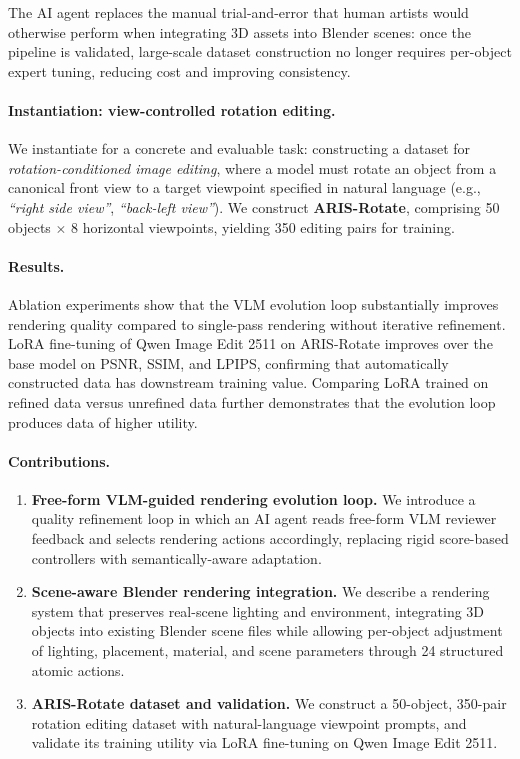 The AI agent replaces the manual trial-and-error that human artists would otherwise perform
when integrating 3D assets into Blender scenes:
once the pipeline is validated, large-scale dataset construction no longer requires
per-object expert tuning, reducing cost and improving consistency.

\paragraph{Instantiation: view-controlled rotation editing.}
We instantiate \aris{} for a concrete and evaluable task:
constructing a dataset for \emph{rotation-conditioned image editing},
where a model must rotate an object from a canonical front view to a target viewpoint
specified in natural language (e.g., \textit{``right side view''}, \textit{``back-left view''}).
We construct \textbf{ARIS-Rotate}, comprising 50 objects $\times$ 8 horizontal viewpoints,
yielding 350 editing pairs for training.

\paragraph{Results.}
Ablation experiments show that the VLM evolution loop substantially
improves rendering quality compared to single-pass rendering without iterative refinement.
LoRA fine-tuning of Qwen Image Edit 2511 on ARIS-Rotate improves over the base model
on PSNR, SSIM, and LPIPS, confirming that automatically constructed data
has downstream training value.
Comparing LoRA trained on refined data versus unrefined data further demonstrates
that the evolution loop produces data of higher utility.

\paragraph{Contributions.}
\begin{enumerate}
  \item \textbf{Free-form VLM-guided rendering evolution loop.}
    We introduce a quality refinement loop in which an AI agent reads
    free-form VLM reviewer feedback and selects rendering actions accordingly,
    replacing rigid score-based controllers with semantically-aware adaptation.

  \item \textbf{Scene-aware Blender rendering integration.}
    We describe a rendering system that preserves real-scene lighting and environment,
    integrating 3D objects into existing Blender scene files while allowing
    per-object adjustment of lighting, placement, material, and scene parameters
    through 24 structured atomic actions.

  \item \textbf{ARIS-Rotate dataset and validation.}
    We construct a 50-object, 350-pair rotation editing dataset with
    natural-language viewpoint prompts, and validate its training utility
    via LoRA fine-tuning on Qwen Image Edit 2511.
\end{enumerate}
